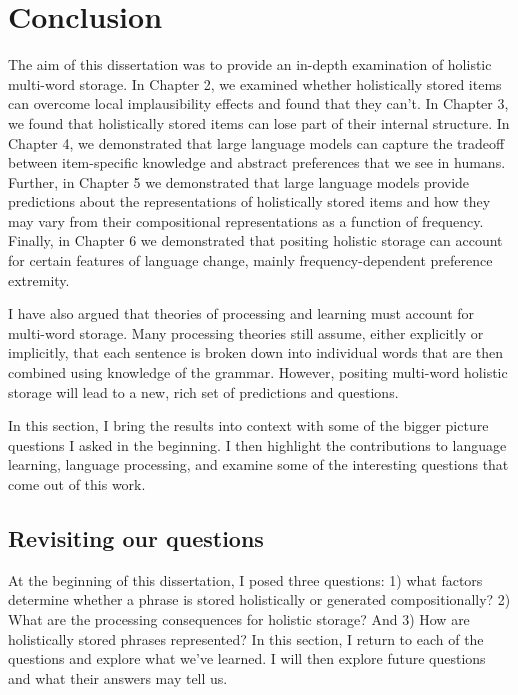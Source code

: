 \documentclass[
  12pt,
  letterpaper,
]{scrreport}
\begin{document}

\chapter{Conclusion}\label{conclusion-4}

The aim of this dissertation was to provide an in-depth examination of
holistic multi-word storage. In Chapter 2, we examined whether
holistically stored items can overcome local implausibility effects and
found that they can't. In Chapter 3, we found that holistically stored
items can lose part of their internal structure. In Chapter 4, we
demonstrated that large language models can capture the tradeoff between
item-specific knowledge and abstract preferences that we see in humans.
Further, in Chapter 5 we demonstrated that large language models provide
predictions about the representations of holistically stored items and
how they may vary from their compositional representations as a function
of frequency. Finally, in Chapter 6 we demonstrated that positing
holistic storage can account for certain features of language change,
mainly frequency-dependent preference extremity.

I have also argued that theories of processing and learning must account
for multi-word storage. Many processing theories still assume, either
explicitly or implicitly, that each sentence is broken down into
individual words that are then combined using knowledge of the grammar.
However, positing multi-word holistic storage will lead to a new, rich
set of predictions and questions.

In this section, I bring the results into context with some of the
bigger picture questions I asked in the beginning. I then highlight the
contributions to language learning, language processing, and examine
some of the interesting questions that come out of this work.

\section{Revisiting our questions}\label{revisiting-our-questions}

At the beginning of this dissertation, I posed three questions: 1) what
factors determine whether a phrase is stored holistically or generated
compositionally? 2) What are the processing consequences for holistic
storage? And 3) How are holistically stored phrases represented? In this
section, I return to each of the questions and explore what we've
learned. I will then explore future questions and what their answers may
tell us.
\end{document}
